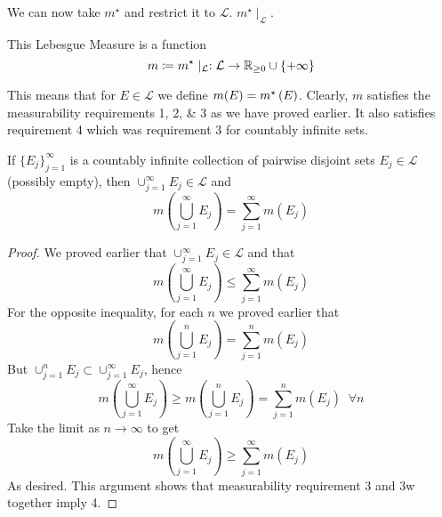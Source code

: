 We can now take $m^{\star}$ and restrict it to $\mathcal{L}$. $m^{\star} \mid_{\mathcal{L}}$.
\begin{definition}
    This Lebesgue Measure is a function
    \[
        m \coloneqq m^{\star} \mid_{\mathcal{L}} : \mathcal{L} \rightarrow \mathbb{R}_{\geq 0} \cup \{ + \infty \}
    \]
\end{definition}
This means that for $E \in \mathcal{L}$ we define $m(E) = m^{\star}\left(E\right)$.
Clearly, $m$ satisfies the measurability requirements 1, 2, \& 3 as we have proved earlier.
It also satisfies requirement 4 which was requirement 3 for countably infinite sets.

\begin{prop}
    If $\{ E_j \}_{j=1}^{\infty}$ is a countably infinite collection of pairwise disjoint sets $E_j \in \mathcal{L}$ (possibly empty), then $\cup_{j=1}^{\infty} E_j \in \mathcal{L}$ and
    \[
        m\left(\bigcup_{j=1}^{\infty} E_j\right) = \sum_{j=1}^{\infty} m(E_j)
    \]
\end{prop}

\begin{proof}
    We proved earlier that $\cup_{j=1}^{\infty} E_j \in \mathcal{L}$ and that
    \[
        m\left(\bigcup_{j=1}^{\infty} E_j\right) \leq \sum_{j=1}^{\infty} m(E_j)
    \]
    For the opposite inequality, for each $n$ we proved earlier that
    \[
        m\left(\bigcup_{j=1}^{n} E_j\right) = \sum_{j=1}^{n} m(E_j)
    \]
    But $\cup_{j=1}^{n} E_j \subset \cup_{j=1}^{\infty} E_j$, hence
    \[
        m\left(\bigcup_{j=1}^{\infty} E_j\right) \geq m\left(\bigcup_{j=1}^{n} E_j\right) =  \sum_{j=1}^{n} m(E_j) \;\; \forall n
    \]
    Take the limit as $n \rightarrow \infty$ to get
    \[
        m\left(\bigcup_{j=1}^{\infty} E_j\right) \geq \sum_{j=1}^{\infty} m(E_j)
    \]
    As desired.
    This argument shows that measurability requirement 3 and 3w together imply 4.
\end{proof}